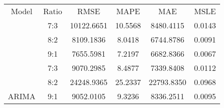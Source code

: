 \documentclass{ieeeojies}
\begin{document}
{\begin{table}[H]
\begin{tabular}{|cccccc|}
\hline
\rowcolor[HTML]{F7C8B7} 
\multicolumn{6}{|c|}{\cellcolor[HTML]{F7C8B7}VCB} \\ \hline
\multicolumn{1}{|c|}{Model} &
  \multicolumn{1}{c|}{Ratio} &
  \multicolumn{1}{c|}{RMSE} &
  \multicolumn{1}{c|}{MAPE} &
  \multicolumn{1}{c|}{MAE} &
  \multicolumn{1}{c|}{MSLE} \\ \hline
\rowcolor[HTML]{E6EFFD} 
\multicolumn{1}{|c|}{\cellcolor[HTML]{E6EFFD}} &
  \multicolumn{1}{c|}{\cellcolor[HTML]{E6EFFD}7:3} &
  \multicolumn{1}{c|}{\cellcolor[HTML]{E6EFFD}10122.6651} &
  \multicolumn{1}{c|}{\cellcolor[HTML]{E6EFFD}10.5568} &
  \multicolumn{1}{c|}{\cellcolor[HTML]{E6EFFD}8480.4115} &
  0.0143 \\ \cline{2-6} 
\rowcolor[HTML]{E6EFFD} 
\multicolumn{1}{|c|}{\cellcolor[HTML]{E6EFFD}} &
  \multicolumn{1}{c|}{\cellcolor[HTML]{E6EFFD}8:2} &
  \multicolumn{1}{c|}{\cellcolor[HTML]{E6EFFD}8109.1836} &
  \multicolumn{1}{c|}{\cellcolor[HTML]{E6EFFD}8.0418} &
  \multicolumn{1}{c|}{\cellcolor[HTML]{E6EFFD}6744.8786} &
  0.0091 \\ \cline{2-6} 
\rowcolor[HTML]{E6EFFD} 
\multicolumn{1}{|c|}{\multirow{-3}{*}{\cellcolor[HTML]{E6EFFD}LR}} &
  \multicolumn{1}{c|}{\cellcolor[HTML]{E6EFFD}9:1} &
  \multicolumn{1}{c|}{\cellcolor[HTML]{E6EFFD}7655.5981} &
  \multicolumn{1}{c|}{\cellcolor[HTML]{E6EFFD}7.2197} &
  \multicolumn{1}{c|}{\cellcolor[HTML]{E6EFFD}6682.8366} &
  0.0067 \\ \hline
\multicolumn{1}{|c|}{} &
  \multicolumn{1}{c|}{\cellcolor[HTML]{FFFFFF}7:3} &
  \multicolumn{1}{c|}{\cellcolor[HTML]{FFFFFF}9070.2985} &
  \multicolumn{1}{c|}{\cellcolor[HTML]{FFFFFF}8.4877} &
  \multicolumn{1}{c|}{\cellcolor[HTML]{FFFFFF}7339.8408} &
  \cellcolor[HTML]{FFFFFF}0.0112 \\ \cline{2-6} 
\multicolumn{1}{|c|}{} &
  \multicolumn{1}{c|}{8:2} &
  \multicolumn{1}{c|}{\cellcolor[HTML]{FFFFFF}24248.9365} &
  \multicolumn{1}{c|}{\cellcolor[HTML]{FFFFFF}25.2337} &
  \multicolumn{1}{c|}{\cellcolor[HTML]{FFFFFF}22793.8350} &
  \cellcolor[HTML]{FFFFFF}0.0968 \\ \cline{2-6} 
\multicolumn{1}{|c|}{\multirow{-3}{*}{ARIMA}} &
  \multicolumn{1}{c|}{\cellcolor[HTML]{FFFFFF}9:1} &
  \multicolumn{1}{c|}{\cellcolor[HTML]{FFFFFF}9052.0105} &
  \multicolumn{1}{c|}{\cellcolor[HTML]{FFFFFF}9.3236} &
  \multicolumn{1}{c|}{\cellcolor[HTML]{FFFFFF}8336.2511} &
  \cellcolor[HTML]{FFFFFF}0.0095 \\ \hline

\end{tabular}
\end{table}}
\end{document}
